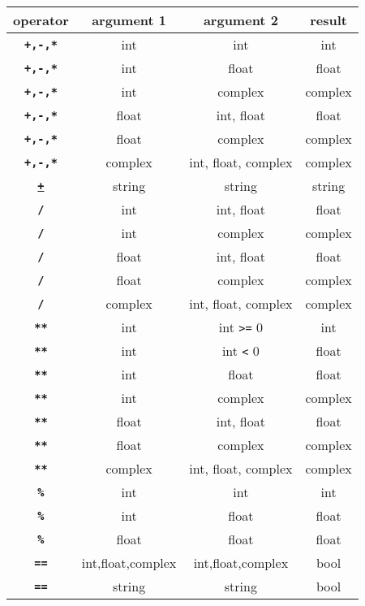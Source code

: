 \begin{center}
\begin{tabular}{c|c|c|c}
operator & argument 1 & argument 2 & result\\ \hline
\texttt{\textbf{+,-,*}} & int       & int       & int\\
\texttt{\textbf{+,-,*}} & int       & float     & float\\
\texttt{\textbf{+,-,*}} & int       & complex   & complex\\
\texttt{\textbf{+,-,*}} & float     & int, float      & float\\
\texttt{\textbf{+,-,*}} & float     & complex   & complex\\
\texttt{\textbf{+,-,*}} & complex   & int, float, complex      & complex\\
\texttt{\href{https://sourceacademy.org/sicpjs/3.3.4\#p24}{\textbf{+}}} & string   & string     & string\\
\texttt{\textbf{/}} & int       & int, float      & float\\
\texttt{\textbf{/}} & int       & complex   & complex\\
\texttt{\textbf{/}} & float     & int, float      & float\\
\texttt{\textbf{/}} & float     & complex   & complex\\
\texttt{\textbf{/}} & complex   & int, float, complex       & complex\\
\texttt{\textbf{**}} & int   & int \verb|>=| 0   & int\\
\texttt{\textbf{**}} & int   & int \verb|<| 0    & float\\
\texttt{\textbf{**}} & int       & float     & float\\
\texttt{\textbf{**}} & int       & complex   & complex\\
\texttt{\textbf{**}} & float     & int, float      & float\\
\texttt{\textbf{**}} & float     & complex   & complex\\
\texttt{\textbf{**}} & complex   & int, float, complex     & complex\\
\texttt{\textbf{\%}} & int   & int   & int\\
\texttt{\textbf{\%}} & int   & float   & float\\
\texttt{\textbf{\%}} & float   & float   & float\\
\texttt{\textbf{==}} & int,float,complex   & int,float,complex     & bool\\
\texttt{\textbf{==}} & string   & string     & bool\\

\end{tabular}
\end{center}
